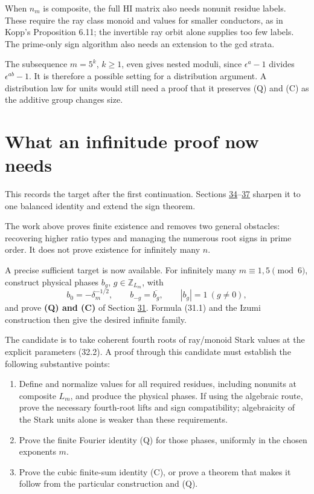 \documentclass[11pt,reqno]{amsart}
\theoremstyle{plain}
\begin{document}
When \(n_m\) is composite, the full HI matrix also needs nonunit
residue labels. These require the ray class monoid and values for
smaller conductors, as in Kopp's Proposition 6.11; the invertible ray
orbit alone supplies too few labels. The prime-only sign algorithm
also needs an extension to the gcd strata.

The subsequence \(m=5^k\), \(k\ge1\), even gives nested moduli,
since \(\epsilon^a-1\) divides \(\epsilon^{ab}-1\). It is therefore
a possible setting for a distribution argument. A distribution law
for units would still need a proof that it preserves (Q) and (C)
as the additive group changes size.

\section{What an infinitude proof now needs}\label{sec:33}

This records the target after the first continuation. Sections \hyperref[sec:34]{34}--\hyperref[sec:37]{37}
sharpen it to one balanced identity and extend the sign theorem.

The work above proves finite existence and removes two general
obstacles: recovering higher ratio types and managing the numerous
root signs in prime order. It does not prove existence for infinitely
many \(n\).

A precise sufficient target is now available. For infinitely many
\(m\equiv1,5\pmod6\), construct physical phases \(b_g\),
\(g\in\mathbb Z_{L_m}\), with
\[
 b_0=-\delta_m^{-1/2},\qquad b_{-g}=\overline{b_g},\qquad
 |b_g|=1\ (g\ne0),
\]
and prove \textbf{(Q) and (C)} of Section \hyperref[sec:31]{31}. Formula (31.1) and the
Izumi construction then give the desired infinite family.

The candidate is to take coherent fourth roots of ray/monoid Stark
values at the explicit parameters (32.2). A proof through this
candidate must establish the following substantive points:

\begin{enumerate}
\item Define and normalize values for all required residues, including
nonunits at composite \(L_m\), and produce the physical phases.
If using the algebraic route, prove the necessary fourth-root lifts
and sign compatibility; algebraicity of the Stark units alone is
weaker than these requirements.
\item Prove the finite Fourier identity (Q) for those phases, uniformly
in the chosen exponents \(m\).
\item Prove the cubic finite-sum identity (C), or prove a theorem that
makes it follow from the particular construction and (Q).
\end{enumerate}
\end{document}
